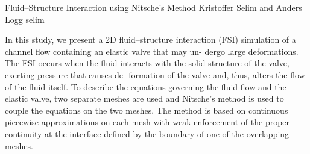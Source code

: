               {Fluid--Structure Interaction using Nitsche's Method}
              {Kristoffer Selim and Anders Logg}
              {selim}

In this study, we present a 2D fluid--structure interaction (FSI)
simulation of a channel flow containing an elastic valve that may un-
dergo large deformations. The FSI occurs when the fluid interacts with
the solid structure of the valve, exerting pressure that causes de-
formation of the valve and, thus, alters the flow of the fluid
itself. To describe the equations governing the fluid flow and the
elastic valve, two separate meshes are used and Nitsche's method is
used to couple the equations on the two meshes. The method is based on
continuous piecewise approximations on each mesh with weak enforcement
of the proper continuity at the interface defined by the boundary of
one of the overlapping meshes.
